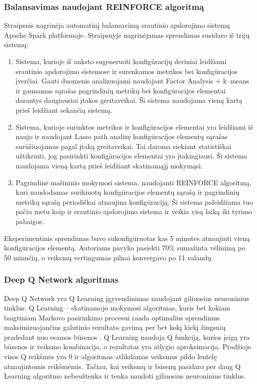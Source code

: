 \documentclass{VUMIFPSbakalaurinis}
\begin{document}
\subsubsection{Balansavimas naudojant REINFORCE algoritmą}
Straipsnis \cite{vaquero2018autotuning} nagrinėja automatinį balansavimą srautinio apdorojimo sistemų Apache Spark platformoje. Straipsnyje nagrinėjamas sprendimas susidaro iš trijų sistemų:
\begin{enumerate}
    \item Sistema, kurioje iš anksto sugeneruoti konfigūracijų deriniai leidžiami srautinio apdorojimo sistemose ir surenkamos metrikos bei konfigūracijos įverčiai. Gauti duomenis analizuojami naudojant Factor Analysis + k–means ir gaunamas sąrašas pagrindinių metrikų bei konfigūracijos elementai darantys daugiausiai įtakos greitaveikai. Ši sistema naudojama vieną kartą prieš leidžiant sekančią sistemą. 
    \item Sistema, kurioje surinktos metrikos ir konfigūracijos elementai yra leidžiami iš naujo ir naudojant Lasso path analizę konfigūracijos elementų sąrašas surūšiuojamas pagal įtaką greitaveikai. Tai daroma siekiant statistiškai užtikrinti, jog pasirinkti konfigūracijos elementai yra įtakingiausi. Ši sistema naudojama vieną kartą prieš leidžiant skatinamąjį mokymąsi.
    \item Pagrindinė mašininio mokymosi sistema, naudojanti REINFORCE algoritmą, kuri naudodamas surikiuotų konfigūracijos elementų sąrašą ir pagrindinių metrikų sąrašą periodiškai atnaujina konfigūraciją. Ši sistema paleidžiama tuo pačiu metu kaip ir srautinio apdorojimo sistema ir veikia visą laiką iki tyrimo pabaigos.
\end{enumerate}  
Eksperimentinis sprendimas buvo sukonfigūruotas kas 5 minutes atnaujinti vieną konfigūracijos elementą. Autoriams pavyko pasiekti 70\% sumažinta vėlinimą po 50 minučių, o veiksmų vertingumas pilnai konvergavo po 11 valandų.

\subsubsection{Deep Q Network algoritmas}
Deep Q Network yra Q Learning įgyvendinimas naudojant giliuosius neuroninius tinklus. Q Learning – skatinamojo mokymosi algoritmas, kuris bet kokiam baigtiniam Markovo pasirinkimo procesui randa optimalius sprendimus maksimizuojančius galutinio rezultato gavimą per bet kokį kiekį žingsnių pradedant nuo esamos būsenos \cite{melo2001convergence}. 
Q Learning naudoja Q funkciją, kurios įeigą yra būsenos ir veiksmo kombinacija, o rezultatas yra atlygio aproksimacija. Pradžioje visos Q reikšmės yra 0 ir algoritmas atlikdamas veiksmus pildo lentelę atnaujintomis reikšmėmis. Tačiau, kai veiksmų ir būsenų pasidaro per daug Q Learning algoritmo nebeužtenka ir tenka naudoti giliuosius neuroninius tinklus.  
\end{document}
